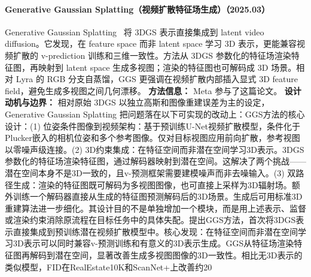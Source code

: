 \paragraph{Generative Gaussian Splatting（视频扩散特征场生成）（2025.03）}
Generative Gaussian Splatting~\cite{2503_13272} 将 3DGS 表示直接集成到 latent video diffusion。它发现，在 feature space 而非 latent space 学习 3D 表示，更能兼容视频扩散的 v-prediction 训练和三维一致性。方法从 3DGS 参数化的特征场渲染特征图，再映射到 latent space 生成多视图；渲染的特征图也可解码成 3D 场景。相对 Lyra 的 RGB 分支自蒸馏，GGS 更强调在视频扩散内部插入显式 3D feature field，避免生成多视图之间几何漂移。
\textbf{方法信息：} Meta 参与了这篇论文。
\textbf{设计动机与边界：} 相对原始 3DGS 以独立高斯和图像重建误差为主的设定，Generative Gaussian Splatting 把问题落在以下可实现的改动上：GGS方法的核心设计：(1) 位姿条件图像到视频架构：基于预训练U-Net视频扩散模型，条件化于Plucker嵌入的相机位姿和多个参考图像。仅对目标视图应用前向扩散，参考视图以零噪声级连接。(2) 3D约束集成：在特征空间而非潜在空间学习3D表示。3DGS参数化的特征场渲染特征图，通过解码器映射到潜在空间。这解决了两个挑战——潜在空间本身不是3D一致的，且v-预测框架需要建模噪声而非去噪输入。(3) 双路径生成：渲染的特征图既可解码为多视图图像，也可直接上采样为3D辐射场。额外训练一个解码器直接从生成的特征图预测解码后的3D场景。生成后可用标准3D重建算法进一步细化。其设计目的不是单独增加一个模块，而是用上述表示、监督或渲染约束消除原流程在目标任务中的具体失配。提出GGS方法，首次将3DGS表示直接集成到预训练潜在视频扩散模型中。核心发现：在特征空间而非潜在空间学习3D表示可以同时兼容v-预测训练和有意义的3D表示生成。GGS从特征场渲染特征图再解码到潜在空间，显著改善生成多视图图像的3D一致性。相比无3D表示的类似模型，FID在RealEstate10K和ScanNet+上改善约20%
